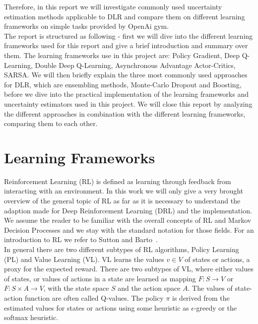 \documentclass[11pt,a4paper]{article}
\begin{document}
	Therefore, in this report we will investigate commonly used uncertainty estimation methods applicable to DLR and compare them on different learning frameworks on simple tasks provided by OpenAi gym.\\

	The report is structured as following - first we will dive into the different learning frameworks used for this report and give a brief introduction and summary over them.
	The learning frameworks use in this project are: Policy Gradient, Deep Q-Learning, Double Deep Q-Learning, Asynchronous Advantage Actor-Critics, SARSA.
	We will then briefly explain the three most commonly used approaches for DLR, which are ensembling methods, Monte-Carlo Dropout and Boosting, before we dive into the practical implementation of the learning frameworks and uncertainty estimators used in this project.
	We will close this report by analyzing the different approaches in combination with the different learning frameworks, comparing them to each other.

	\section{Learning Frameworks}\label{sec:learning-frameworks}
	Reinforcement Learning (RL) is defined as learning through feedback from interacting with an environment.
	In this work we will only give a very brought overview of the general topic of RL as far as it is necessary to understand the adaption made for Deep Reinforcement Learning (DRL) and the implementation.
	We assume the reader to be familiar with the overall concepts of RL and Markov Decision Processes and we stay with the standard notation for those fields.
	For an introduction to RL we refer to Sutton and Barto~\cite{sutton_introduction_1998}.\\

	In general there are two different subtypes of RL algorithms, Policy Learning (PL) and Value Learning (VL).
	VL learns the values  $v \in V$ of states or actions, a proxy for the expected reward.
	There are two subtypes of VL, where either values of states, or values of actions in a state are learned as mapping $F: S \rightarrow V$ or $F: S \times A \rightarrow V$, with the state space $S$ and the action space $A$.
	The values of state-action function are often called Q-values.
	The policy $\pi$ is derived from the estimated values for states or actions using some heuristic as $\epsilon$-greedy or the softmax heuristic.\\
\end{document}
